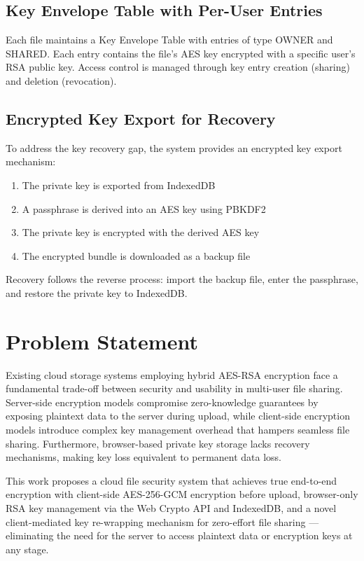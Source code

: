 \documentclass[conference]{IEEEtran}
\begin{document}
\subsection{Key Envelope Table with Per-User Entries}

Each file maintains a Key Envelope Table with entries of type OWNER and SHARED. Each entry contains the file's AES key encrypted with a specific user's RSA public key. Access control is managed through key entry creation (sharing) and deletion (revocation).

\subsection{Encrypted Key Export for Recovery}

To address the key recovery gap, the system provides an encrypted key export mechanism:
\begin{enumerate}
    \item The private key is exported from IndexedDB
    \item A passphrase is derived into an AES key using PBKDF2
    \item The private key is encrypted with the derived AES key
    \item The encrypted bundle is downloaded as a backup file
\end{enumerate}

Recovery follows the reverse process: import the backup file, enter the passphrase, and restore the private key to IndexedDB.

\section{Problem Statement}

Existing cloud storage systems employing hybrid AES-RSA encryption face a fundamental trade-off between security and usability in multi-user file sharing. Server-side encryption models compromise zero-knowledge guarantees by exposing plaintext data to the server during upload, while client-side encryption models introduce complex key management overhead that hampers seamless file sharing. Furthermore, browser-based private key storage lacks recovery mechanisms, making key loss equivalent to permanent data loss.

This work proposes a cloud file security system that achieves true end-to-end encryption with client-side AES-256-GCM encryption before upload, browser-only RSA key management via the Web Crypto API and IndexedDB, and a novel client-mediated key re-wrapping mechanism for zero-effort file sharing --- eliminating the need for the server to access plaintext data or encryption keys at any stage.
\end{document}

